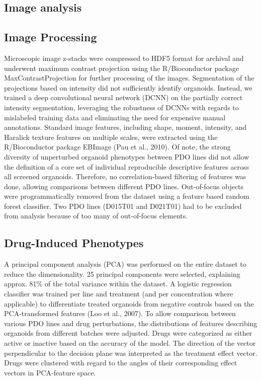 \begin{flushleft}
\section{Image analysis}

\subsection{Image Processing}
Microscopic image z-stacks were compressed to HDF5 format for archival and underwent maximum contrast projection using the R/Bioconductor package MaxContrastProjection for further processing of the images. Segmentation of the projections based on intensity did not sufficiently identify organoids. Instead, we trained a deep convolutional neural network (DCNN) on the partially correct intensity segmentation, leveraging the robustness of DCNNs with regards to mislabeled training data and eliminating the need for expensive manual annotations. Standard image features, including shape, moment, intensity, and Haralick texture features on multiple scales, were extracted using the R/Bioconductor package EBImage (Pau et al., 2010). Of note, the strong diversity of unperturbed organoid phenotypes between PDO lines did not allow the definition of a core set of individual reproducible descriptive features across all screened organoids. Therefore, no correlation-based filtering of features was done, allowing comparisons between different PDO lines. Out-of-focus objects were programmatically removed from the dataset using a feature based random forest classifier. Two PDO lines (D015T01 and D021T01) had to be excluded from analysis because of too many of out-of-focus elements.

\subsection{Drug-Induced Phenotypes}
A principal component analysis (PCA) was performed on the entire dataset to reduce the dimensionality. 25 principal components were selected, explaining approx. 81\% of the total variance within the dataset. A logistic regression classifier was trained per line and treatment (and per concentration where applicable) to differentiate treated organoids from negative controls based on the PCA-transformed features (Loo et al., 2007). To allow comparison between various PDO lines and drug perturbations, the distributions of features describing organoids from different batches were adjusted. Drugs were categorized as either active or inactive based on the accuracy of the model. The direction of the vector perpendicular to the decision plane was interpreted as the treatment effect vector. Drugs were clustered with regard to the angles of their corresponding effect vectors in PCA-feature space.


\end{flushleft}
